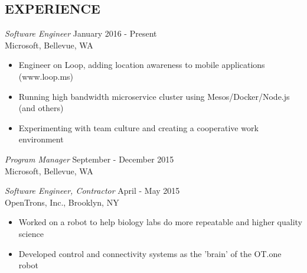 \documentclass[margin,4pt]{res} %
\begin{document}
\address{virajosinha@gmail.com\\ vsinha.com \\github.com/vsinha}
\address{1451 20th Ave\\ Seattle, WA 98122\\(408) 505-1275}


\begin{resume}



 
\section{EXPERIENCE} 
	{\sl Software Engineer} \hfill January 2016 - Present\\
		Microsoft, Bellevue, WA
		\begin{itemize} \itemsep -2pt
		\item Engineer on Loop, adding location awareness to mobile applications (www.loop.ms)
		\item Running high bandwidth microservice cluster using Mesos/Docker/Node.js (and others)
		\item Experimenting with team culture and creating a cooperative work environment
		\end{itemize}

	{\sl Program Manager} \hfill September - December 2015\\
		Microsoft, Bellevue, WA

	{\sl Software Engineer, Contractor} \hfill April - May 2015\\
		OpenTrons, Inc., Brooklyn, NY
		\begin{itemize} \itemsep -2pt
		\item Worked on a robot to help biology labs do more repeatable and higher quality science
		\item Developed control and connectivity systems as the 'brain' of the OT.one robot
		\end{itemize}


\end{resume}
\end{document}
